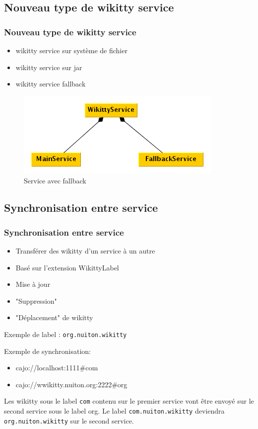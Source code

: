 \documentclass[12pt,a4paper,utf8x]{beamer}
\begin{document}
\subsection*{Nouveau type de wikitty service}
\begin{frame}\frametitle{Nouveau type de wikitty service}
\begin{itemize}
\item wikitty service sur système de fichier
\item wikitty service sur jar
\item wikitty service fallback\pause
\end{itemize}\pause
\begin{figure}
\includegraphics[scale=0.5]{../image/multicontext.png} 
\caption{Service avec fallback}
\end{figure}
\end{frame}

\subsection*{Synchronisation entre service}
\begin{frame}\frametitle{Synchronisation entre service}
\begin{itemize}
\item Transférer des wikitty d'un service à un autre
\item Basé sur l'extension WikittyLabel
\item Mise à jour
\item "Suppression"
\item "Déplacement" de wikitty
\end{itemize}
\pause
Exemple de label :
\verb!org.nuiton.wikitty!
\end{frame}

\begin{frame}
Exemple de synchronisation:
\begin{itemize}
\item cajo://localhost:1111\#com
\item cajo://wwikitty.nuiton.org:2222\#org
\end{itemize}
\vspace{5mm}
Les wikitty sous le label \verb!com! contenu sur le premier service vont
être envoyé sur le second service sous le label org.
\vspace{5mm}
Le label \verb!com.nuiton.wikitty! deviendra \verb!org.nuiton.wikitty! sur 
le second service.
\end{frame}
\end{document}
